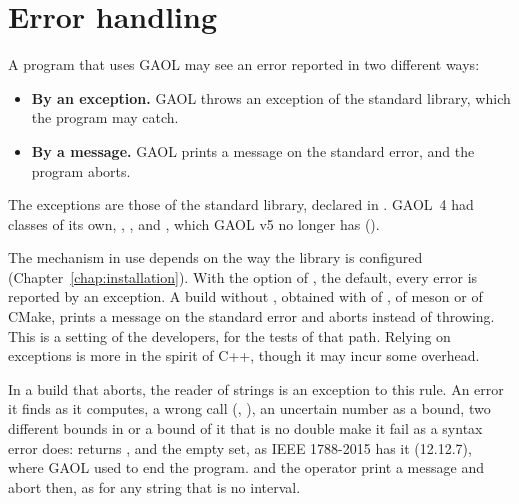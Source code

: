 \documentclass[12pt,a4paper,twoside,openright]{book}
\begin{document}
\section{Error handling}\label{sec:errors-handling}
%

A program that uses GAOL may see an error reported in two different ways:
\begin{itemize}
\item[$\bullet$] \textbf{By an exception.} GAOL throws an exception of the
  standard library, which the program may catch.
\item[$\bullet$] \textbf{By a message.} GAOL prints a message on the
  standard error, and the program aborts.
\end{itemize}

\noindent
The exceptions are those of the standard library, declared in
. GAOL~4 had classes of its own, ,
,  and
, which GAOL v5 no longer has
().\newinvfive

\medskip
The mechanism in use depends on the way the library is configured
(Chapter~\ref{chap:installation}). With the option
 of , the default, every error
is reported by an exception. A build without
, obtained with 
of ,  of meson or
 of CMake, prints a
message on the standard error and aborts instead of throwing. This is a setting
of the developers, for the tests of that path. Relying on exceptions is more in the
spirit of C++, though it may incur some overhead.

\begin{Rem}
In a build that aborts, the reader of strings is an exception to this rule. An error it
finds as it computes, a wrong call (,
), an uncertain number as a bound, two different bounds in
 or a bound of it that is no double make it fail as a syntax
error does:  returns , and
 the empty set, as IEEE 1788-2015 has
it (12.12.7), where GAOL used to end the program.
 and the operator \code{>{}>} print a message
and abort then, as for any string that is no interval.\newinvfive
\end{Rem}
\end{document}
